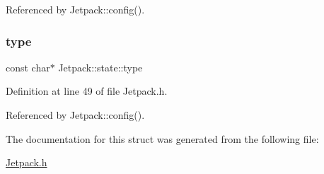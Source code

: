 Referenced by Jetpack\+::config().

\mbox{\label{structJetpack_1_1state_a59e307555493f5a64f87ac4c63943371}} 
\subsubsection{\texorpdfstring{type}{type}}
{\footnotesize\ttfamily const char$\ast$ Jetpack\+::state\+::type}



Definition at line 49 of file Jetpack.\+h.



Referenced by Jetpack\+::config().



The documentation for this struct was generated from the following file\+:\begin{DoxyCompactItemize}
\item 
\hyperlink{Jetpack_8h}{Jetpack.\+h}\end{DoxyCompactItemize}
